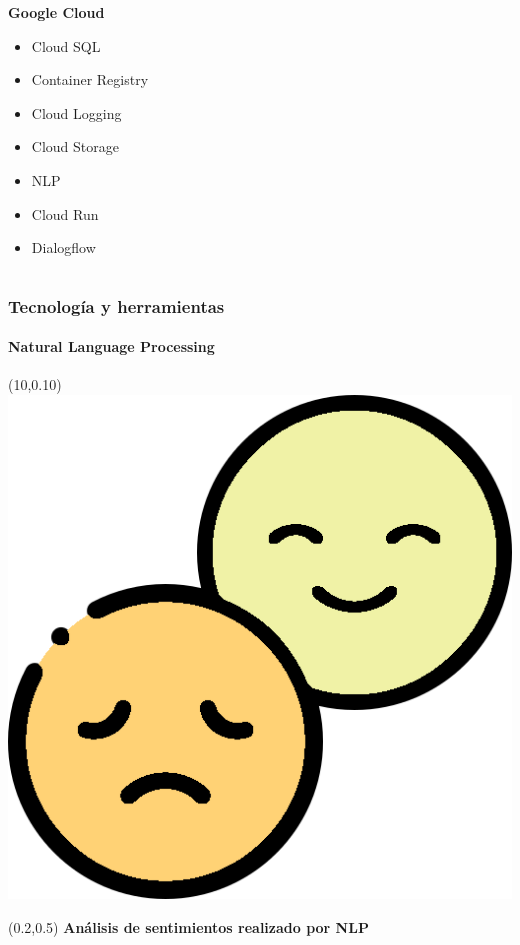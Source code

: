 \documentclass[10pt]{beamer}
\begin{document}
\begin{frame}
\begin{columns}[T]
\begin{column}{0.33\textwidth}
\begin{textblock}{1.75}
	\end{textblock}
    \textbf{\textcolor{burgundy}{Google Cloud}}
    \begin{itemize}
    	\item Cloud SQL
   		\item Container Registry
   		\item Cloud Logging
   		\item Cloud Storage
   		\item NLP
   		\item Cloud Run
   		\item Dialogflow
   \end{itemize}
\end{column}
\end{columns}
\end{frame}

\begin{frame}
\frametitle{Tecnología y herramientas}
\framesubtitle{Natural Language Processing}
\begin{textblock}{1.25}(10,0.10)
	\includegraphics[width = 1\textwidth]{Figuras/emoticonos.png}
\end{textblock}
\begin{textblock}{15}(0.2,0.5)
	\large \textbf{\textcolor{pantone}{Análisis de sentimientos realizado por NLP}}
\end{textblock}

\end{frame}
\end{document}
